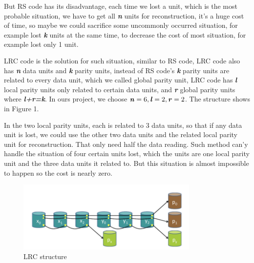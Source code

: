\documentclass[10pt]{article}
\begin{document}
But RS code has its disadvantage, each time we lost a unit, which is the most probable situation, we have to get all \textbf{\textit{n}} units for reconstruction, it's a huge cost of time, so maybe we could sacrifice some uncommonly occurred situation, for example lost \textbf{\textit{k}} units at the same time, to decrease the cost of most situation, for example lost only 1 unit.

LRC code is the solution for such situation, similar to RS code, LRC code also has \textbf{\textit{n}} data units and \textbf{\textit{k}} parity units, instead of RS code's \textbf{\textit{k}} parity units are related to every data unit, which we called global parity unit, LRC code has \textbf{\textit{l}} local parity units only related to certain data units, and \textbf{\textit{r}} global parity units where \textbf{\textit{l+r=k}}. In ours project, we choose $\textbf{\textit{n}}=6, \textbf{\textit{l}}=2, \textbf{\textit{r}}=2$. The structure shows in Figure 1. 


In the two local parity units, each is related to 3 data units, so that if any data unit is lost, we could use the other two data units and the related local parity unit for reconstruction. That only need half the data reading. Such method can'y handle the situation of four certain units lost, which the units are one local parity unit and the three data units it related to. But this situation is almost impossible to happen so the cost is nearly zero.

\begin{figure}[H]
\centerline{\includegraphics[width = 0.8\textwidth]{LRC-1.png}}
\caption{LRC structure}
\end{figure}
\end{document}
